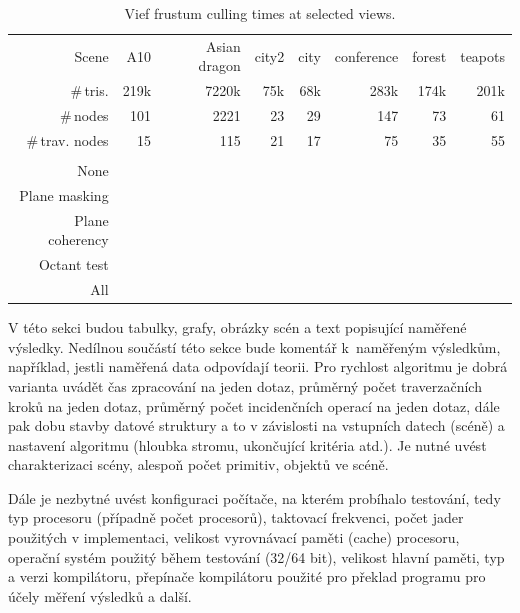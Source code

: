 \documentclass[report,11pt]{elsarticle}
\begin{document}
\begin{table}[t]
\begin{center}
\begin{tabular}{| r || r | r | r | r | r | r | r |}
	\hline
	Scene                                   & A10 & Asian dragon & city2 & city & conference & forest & teapots \\
	\#\,tris.                               & 219k & 7220k & 75k & 68k & 283k & 174k & 201k \\
	\#\,nodes                               & 101 & 2221 & 23 & 29 & 147 & 73 & 61 \\
	\#\,trav. nodes                         & 15  & 115  & 21 & 17 & 75  & 35 & 55 \\
	\diagbox{Optimization}{} &&&&&&& \\
\hline
\hline
	None            & & & & & & & \\
\hline
	Plane masking   & & & & & & & \\
\hline
	Plane coherency & & & & & & & \\
\hline
	Octant test     & & & & & & & \\
\hline
	All             & & & & & & & \\
\hline
\end{tabular}
\end{center}
\caption{Vief frustum culling times at selected views.}
\end{table}

V této sekci budou tabulky, grafy, obrázky scén a text popisující
naměřené výsledky. Nedílnou součástí této sekce bude komentář
k~naměřeným výsledkům, například, jestli naměřená data odpovídají
teorii. Pro rychlost algoritmu je dobrá varianta uvádět čas zpracování
na jeden dotaz, průměrný počet traverzačních kroků na jeden dotaz,
průměrný počet incidenčních operací na jeden dotaz, dále pak dobu
stavby datové struktury a to v závislosti na vstupních datech (scéně)
a nastavení algoritmu (hloubka stromu, ukončující kritéria atd.). Je
nutné uvést charakterizaci scény, alespoň počet primitiv, objektů ve
scéně.

Dále je nezbytné uvést konfiguraci počítače, na kterém probíhalo
testování, tedy typ procesoru (případně počet procesorů), taktovací
frekvenci, počet jader použitých v implementaci, velikost vyrovnávací
paměti (cache) procesoru, operační systém použitý během testování
(32/64 bit), velikost hlavní paměti, typ a verzi kompilátoru,
přepínače kompilátoru použité pro překlad programu pro účely měření
výsledků a další.\\
\end{document}
